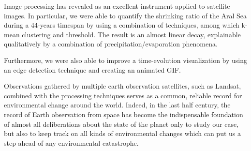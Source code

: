 Image processing has revealed as an excellent instrument applied to satellite images. 
In particular, we were able to quantify the shrinking ratio of the Aral Sea during a 44-years timespan by using a combination of techniques, among which k-mean clustering and threshold. 
The result is an almost linear decay, explainable qualitatively by a combination of precipitation/evaporation phenomena.

Furthermore, we were also able to improve a time-evolution visualization by using an edge detection technique and creating an animated GIF.

Observations gathered by multiple earth observation satellites, such as Landsat, combined with the processing techniques serves as a common, reliable record for environmental change around the world. 
Indeed, in the last half century, the record of Earth observation from space has become the indispensable foundation of almost all deliberations about the state of the planet only to study our case, but also to keep track on all kinds of environmental changes which can put us a step ahead of any environmental catastrophe.
